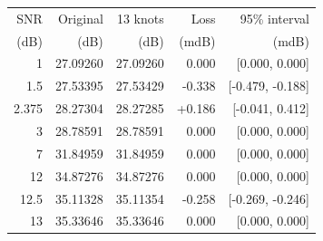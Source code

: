 \setlength{\tabcolsep}{3pt}
\begin{tabular}{rrrrr}
\toprule
SNR & Original & 13 knots & Loss & 95\% interval \\
(dB) & (dB) & (dB) & (mdB) & (mdB) \\
\midrule
1 & 27.09260 & 27.09260 & 0.000 & [0.000, 0.000] \\
1.5 & 27.53395 & 27.53429 & -0.338 & [-0.479, -0.188] \\
2.375 & 28.27304 & 28.27285 & +0.186 & [-0.041, 0.412] \\
3 & 28.78591 & 28.78591 & 0.000 & [0.000, 0.000] \\
7 & 31.84959 & 31.84959 & 0.000 & [0.000, 0.000] \\
12 & 34.87276 & 34.87276 & 0.000 & [0.000, 0.000] \\
12.5 & 35.11328 & 35.11354 & -0.258 & [-0.269, -0.246] \\
13 & 35.33646 & 35.33646 & 0.000 & [0.000, 0.000] \\
\bottomrule
\end{tabular}
